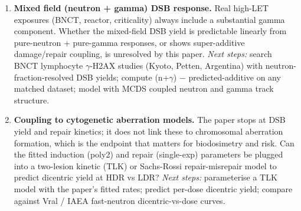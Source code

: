 \begin{enumerate}
  \item \textbf{Mixed field (neutron + gamma) DSB response.} Real high-LET
        exposures (BNCT, reactor, criticality) always include a substantial
        gamma component. Whether the mixed-field DSB yield is predictable
        linearly from pure-neutron + pure-gamma responses, or shows
        super-additive damage/repair coupling, is unresolved by this paper.
        \emph{Next steps:} search BNCT lymphocyte $\gamma$-H2AX studies
        (Kyoto, Petten, Argentina) with neutron-fraction-resolved DSB yields;
        compute (n+$\gamma$) $-$ predicted-additive on any matched dataset;
        model with MCDS coupled neutron and gamma track structure.

  \item \textbf{Coupling to cytogenetic aberration models.} The paper stops at
        DSB yield and repair kinetics; it does not link these to chromosomal
        aberration formation, which is the endpoint that matters for
        biodosimetry and risk. Can the fitted induction (poly2) and repair
        (single-exp) parameters be plugged into a two-lesion kinetic (TLK) or
        Sachs-Rossi repair-misrepair model to predict dicentric yield at HDR
        vs LDR?
        \emph{Next steps:} parameterise a TLK model with the paper's fitted
        rates; predict per-dose dicentric yield; compare against Vral / IAEA
        fast-neutron dicentric-vs-dose curves.
\end{enumerate}
